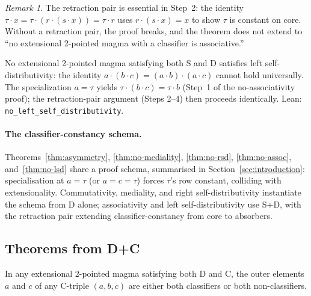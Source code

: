 \documentclass[sigconf,screen]{acmart}
\newcommand{\dotop}{\cdot}
\theoremstyle{remark}
\newtheorem{remark}{Remark}
\begin{document}
\begin{remark}
The retraction pair is essential in Step~2: the identity $\tau \dotop x = \tau \dotop (r \dotop (s \dotop x)) = \tau \dotop r$ uses $r \dotop (s \dotop x) = x$ to show $\tau$ is constant on core. Without a retraction pair, the proof breaks, and the theorem does not extend to ``no extensional 2-pointed magma with a classifier is associative.''
\end{remark}

\begin{theorem}
\label{thm:no-lsd}
No extensional 2-pointed magma satisfying both S and D satisfies left self-distributivity: the identity $a \dotop (b \dotop c) = (a \dotop b) \dotop (a \dotop c)$ cannot hold universally. The specialization $a = \tau$ yields $\tau \dotop (b \dotop c) = \tau \dotop b$ (Step~1 of the no-associativity proof); the retraction-pair argument (Steps 2--4) then proceeds identically. Lean: \texttt{no\_left\_self\_distributivity}.
\end{theorem}

\paragraph{The classifier-constancy schema.}
Theorems~\ref{thm:asymmetry}, \ref{thm:no-mediality}, \ref{thm:no-rsd}, \ref{thm:no-assoc}, and~\ref{thm:no-lsd} share a proof schema, summarised in Section~\ref{sec:introduction}: specialisation at $a = \tau$ (or $a = c = \tau$) forces $\tau$'s row constant, colliding with extensionality. Commutativity, mediality, and right self-distributivity instantiate the schema from D alone; associativity and left self-distributivity use S+D, with the retraction pair extending classifier-constancy from core to absorbers.

\subsection{Theorems from D+C}\label{subsec:from-DC}

\begin{theorem}
\label{thm:h-triple-coherence}
In any extensional 2-pointed magma satisfying both D and C, the outer elements $a$ and $c$ of any C-triple $(a, b, c)$ are either both classifiers or both non-classifiers.
\end{theorem}
\end{document}
